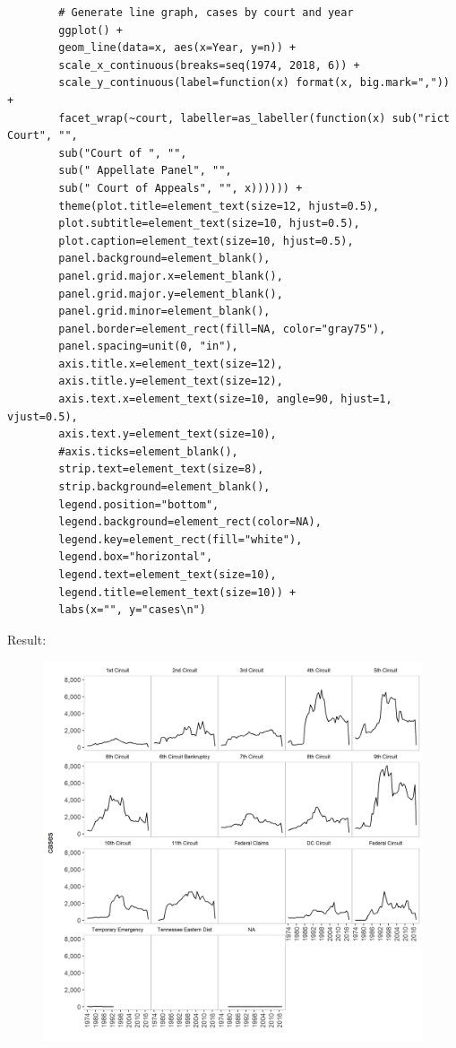 \documentclass[10pt, letterpaper]{article}
\begin{document}
\begin{spacing}{1.0}
\begin{itemize}
\begin{verbatim}
        # Generate line graph, cases by court and year
        ggplot() +
        geom_line(data=x, aes(x=Year, y=n)) +
        scale_x_continuous(breaks=seq(1974, 2018, 6)) +
        scale_y_continuous(label=function(x) format(x, big.mark=",")) +
        facet_wrap(~court, labeller=as_labeller(function(x) sub("rict Court", "",
        sub("Court of ", "",
        sub(" Appellate Panel", "",
        sub(" Court of Appeals", "", x)))))) +
        theme(plot.title=element_text(size=12, hjust=0.5),
        plot.subtitle=element_text(size=10, hjust=0.5),
        plot.caption=element_text(size=10, hjust=0.5),
        panel.background=element_blank(),
        panel.grid.major.x=element_blank(),
        panel.grid.major.y=element_blank(),
        panel.grid.minor=element_blank(),
        panel.border=element_rect(fill=NA, color="gray75"),
        panel.spacing=unit(0, "in"),
        axis.title.x=element_text(size=12),
        axis.title.y=element_text(size=12),
        axis.text.x=element_text(size=10, angle=90, hjust=1, vjust=0.5),
        axis.text.y=element_text(size=10),
        #axis.ticks=element_blank(),
        strip.text=element_text(size=8),
        strip.background=element_blank(),
        legend.position="bottom",
        legend.background=element_rect(color=NA),
        legend.key=element_rect(fill="white"),
        legend.box="horizontal",
        legend.text=element_text(size=10),
        legend.title=element_text(size=10)) +
        labs(x="", y="cases\n")
    \end{verbatim}
    \normalsize
    \newpage
    Result:
    \small
    \begin{figure}[H]
        \includegraphics[width=5in]{CourtYearCaseLineGraph.png}
        \centering
        \caption*{\vspace{-0.5in}}
        \label{}
    \end{figure}
    \normalsize


\end{itemize}


\end{spacing}
\end{document}
